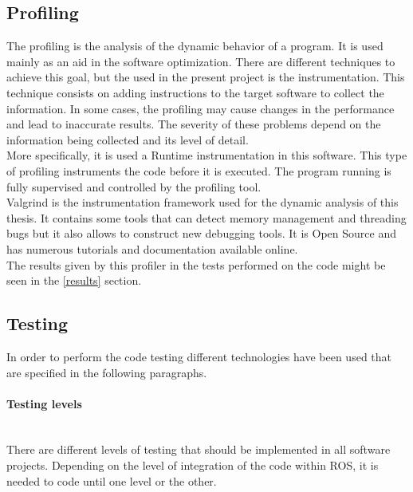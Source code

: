 	\subsection{Profiling}
		\label{profiling}
		The profiling is the analysis of the dynamic behavior of a program. It is used mainly as an aid in the software optimization. There are different techniques to achieve this goal, but the used in the present project is the instrumentation. This technique consists on adding instructions to the target software to collect the information. In some cases, the profiling may cause changes in the performance and lead to inaccurate results. The severity of these problems depend on the information being collected and its level of detail. 
		\\

		More specifically, it is used a Runtime instrumentation in this software. This type of profiling instruments the code before it is executed. The program running is fully supervised and controlled by the profiling tool. 
		\\

		Valgrind \cite{valgrind} is the instrumentation framework used for the dynamic analysis of this thesis. It contains some tools that can detect memory management and threading bugs but it also allows to construct new debugging tools. It is Open Source and has numerous tutorials and documentation available online. \\

		The results given by this profiler in the tests performed on the code might be seen in the \ref{results} section. 


	\subsection{Testing}
		\label{technologies_testing}
		In order to perform the code testing different technologies have been used that are specified in the following paragraphs. 
		\\


		\paragraph {Testing levels}\mbox{} \\

		There are different levels of testing that should be implemented in all software projects. Depending on the level of integration of the code within ROS, it is needed to code until one level or the other. 		\\

